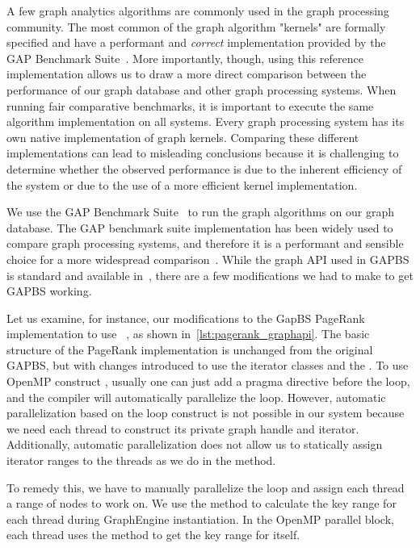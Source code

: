 A few graph analytics algorithms are commonly used in the graph processing community.
The most common of the graph algorithm "kernels" are formally specified and have a performant and \emph{correct} implementation provided by the GAP Benchmark Suite~\cite{DBLP:journals/corr/BeamerAP15}.
More importantly, though, using this reference implementation allows us to draw a more direct comparison between the performance of our graph database and other graph processing systems.
When running fair comparative benchmarks, it is important to execute the same algorithm implementation on all systems.
Every graph processing system has its own native implementation of graph kernels. 
Comparing these different implementations can lead to misleading conclusions because it is challenging to determine whether the observed performance is due to the inherent efficiency of the system or due to the use of a more efficient kernel implementation.

We use the GAP Benchmark Suite~\cite{beamer2015gap} to run the graph algorithms on our graph database.
The GAP benchmark suite implementation has been widely used to compare graph processing systems, and therefore it is a performant and sensible choice for a more widespread comparison~\cite{teseo2021deLeo}.
While the graph API used in GAPBS is standard and available in~\project{}, there are a few modifications we had to make to get GAPBS working.

Let us examine, for instance, our modifications to the GapBS PageRank implementation to 
use ~\api{}, as shown in~\autoref{lst:pagerank_graphapi}.
The basic structure of the PageRank implementation is unchanged from the original GAPBS, but with changes introduced to use the iterator classes and the \api{}.
To use OpenMP construct , usually one can just add a pragma directive before the loop, and the compiler will automatically parallelize the loop.
However, automatic parallelization based on the loop construct is not possible in our system because we need each thread to construct its private graph handle and iterator. Additionally, automatic parallelization does not allow us to statically assign iterator ranges to the threads as we do in the  method.

To remedy this, we have to manually parallelize the loop and assign each thread a range of nodes to work on.
We use the  method to calculate the key range for each thread during GraphEngine instantiation. 
In the OpenMP parallel block, each thread uses the  method to get the key range for itself.

